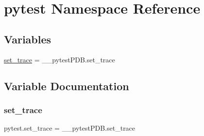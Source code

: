 \hypertarget{namespacepytest}{}\section{pytest Namespace Reference}
\label{namespacepytest}
\subsection*{Variables}
\begin{DoxyCompactItemize}
\item 
\hyperlink{namespacepytest_ab0c4276fbd2c8ad36bcd308ee7ddd01e}{set\+\_\+trace} = \+\_\+\+\_\+pytest\+P\+D\+B.\+set\+\_\+trace
\end{DoxyCompactItemize}


\subsection{Variable Documentation}
\mbox{\label{namespacepytest_ab0c4276fbd2c8ad36bcd308ee7ddd01e}} 
\subsubsection{\texorpdfstring{set\+\_\+trace}{set\_trace}}
{\footnotesize\ttfamily pytest.\+set\+\_\+trace = \+\_\+\+\_\+pytest\+P\+D\+B.\+set\+\_\+trace}

